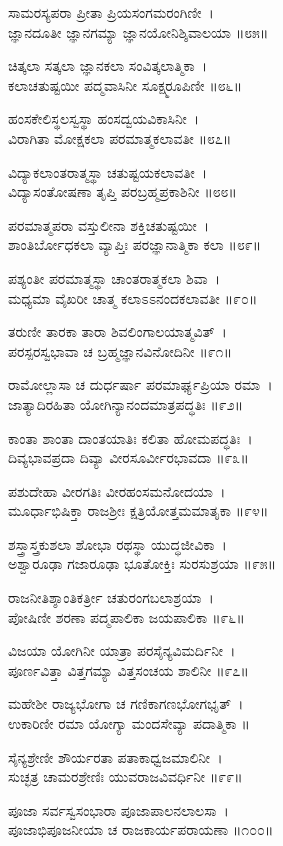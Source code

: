 ಸಾಮರಸ್ಯಪರಾ ಪ್ರೀತಾ ಪ್ರಿಯಸಂಗಮರಂಗಿಣೀ~।\\
ಜ್ಞಾನದೂತೀ ಜ್ಞಾನಗಮ್ಯಾ ಜ್ಞಾನಯೋನಿಶ್ಶಿವಾಲಯಾ ॥೮೫॥

	ಚಿತ್ಕಲಾ ಸತ್ಕಲಾ ಜ್ಞಾನಕಲಾ ಸಂವಿತ್ಕಲಾತ್ಮಿಕಾ~।\\
	ಕಲಾಚತುಷ್ಟಯೀ ಪದ್ಮವಾಸಿನೀ ಸೂಕ್ಷ್ಮರೂಪಿಣೀ ॥೮೬॥

ಹಂಸಕೇಲಿಸ್ಥಲಸ್ವಸ್ಥಾ ಹಂಸದ್ವಯವಿಕಾಸಿನೀ~।\\
ವಿರಾಗಿತಾ ಮೋಕ್ಷಕಲಾ ಪರಮಾತ್ಮಕಲಾವತೀ ॥೮೭॥

	ವಿದ್ಯಾಕಲಾಂತರಾತ್ಮಸ್ಥಾ ಚತುಷ್ಟಯಕಲಾವತೀ~।\\
	ವಿದ್ಯಾಸಂತೋಷಣಾ ತೃಪ್ತಿ ಪರಬ್ರಹ್ಮಪ್ರಕಾಶಿನೀ ॥೮೮॥

ಪರಮಾತ್ಮಪರಾ ವಸ್ತುಲೀನಾ ಶಕ್ತಿಚತುಷ್ಟಯೀ~।\\
ಶಾಂತಿರ್ಬೋಧಕಲಾ ವ್ಯಾಪ್ತಿಃ ಪರಜ್ಞಾನಾತ್ಮಿಕಾ ಕಲಾ ॥೮೯॥

	ಪಶ್ಯಂತೀ ಪರಮಾತ್ಮಸ್ಥಾ ಚಾಂತರಾತ್ಮಕಲಾ ಶಿವಾ~।\\
	ಮಧ್ಯಮಾ ವೈಖರೀ ಚಾತ್ಮ ಕಲಾಽಽನಂದಕಲಾವತೀ ॥೯೦॥

ತರುಣೀ ತಾರಕಾ ತಾರಾ ಶಿವಲಿಂಗಾಲಯಾತ್ಮವಿತ್~।\\
ಪರಸ್ಪರಸ್ವಭಾವಾ ಚ ಬ್ರಹ್ಮಜ್ಞಾನವಿನೋದಿನೀ ॥೯೧॥

	ರಾಮೋಲ್ಲಾಸಾ ಚ ದುರ್ಧರ್ಷಾ ಪರಮಾರ್ಘ್ಯಪ್ರಿಯಾ ರಮಾ~।\\
	ಜಾತ್ಯಾದಿರಹಿತಾ ಯೋಗಿನ್ಯಾನಂದಮಾತ್ರಪದ್ಧತಿಃ ॥೯೨॥

ಕಾಂತಾ ಶಾಂತಾ ದಾಂತಯಾತಿಃ ಕಲಿತಾ ಹೋಮಪದ್ಧತಿಃ~।\\
ದಿವ್ಯಭಾವಪ್ರದಾ ದಿವ್ಯಾ ವೀರಸೂರ್ವೀರಭಾವದಾ ॥೯೩॥

	ಪಶುದೇಹಾ ವೀರಗತಿಃ ವೀರಹಂಸಮನೋದಯಾ~।\\
	ಮೂರ್ಧಾಭಿಷಿಕ್ತಾ ರಾಜಶ್ರೀಃ ಕ್ಷತ್ರಿಯೋತ್ತಮಮಾತೃಕಾ ॥೯೪॥

ಶಸ್ತ್ರಾಸ್ತ್ರಕುಶಲಾ ಶೋಭಾ ರಥಸ್ಥಾ ಯುದ್ಧಜೀವಿಕಾ~।\\
ಅಶ್ವಾರೂಢಾ ಗಜಾರೂಢಾ ಭೂತೋಕ್ತಿಃ ಸುರಸುಶ್ರಯಾ ॥೯೫॥

	ರಾಜನೀತಿಶ್ಶಾಂತಿಕರ್ತ್ರೀ ಚತುರಂಗಬಲಾಶ್ರಯಾ~।\\
	ಪೋಷಿಣೀ ಶರಣಾ ಪದ್ಮಪಾಲಿಕಾ ಜಯಪಾಲಿಕಾ ॥೯೬॥

ವಿಜಯಾ ಯೋಗಿನೀ ಯಾತ್ರಾ ಪರಸೈನ್ಯವಿಮರ್ದಿನೀ~।\\
ಪೂರ್ಣವಿತ್ತಾ ವಿತ್ತಗಮ್ಯಾ ವಿತ್ತಸಂಚಯ ಶಾಲಿನೀ ॥೯೭॥

	ಮಹೇಶೀ ರಾಜ್ಯಭೋಗಾ ಚ ಗಣಿಕಾಗಣಭೋಗಭೃತ್~।\\
	ಉಕಾರಿಣೀ ರಮಾ ಯೋಗ್ಯಾ ಮಂದಸೇವ್ಯಾ ಪದಾತ್ಮಿಕಾ ॥

ಸೈನ್ಯಶ್ರೇಣೀ ಶೌರ್ಯರತಾ ಪತಾಕಾಧ್ವಜಮಾಲಿನೀ~।\\
ಸುಚ್ಛತ್ರ ಚಾಮರಶ್ರೇಣಿಃ ಯುವರಾಜವಿವರ್ಧಿನೀ ॥೯೯॥

	ಪೂಜಾ ಸರ್ವಸ್ವಸಂಭಾರಾ ಪೂಜಾಪಾಲನಲಾಲಸಾ~।\\
	ಪೂಜಾಭಿಪೂಜನೀಯಾ ಚ ರಾಜಕಾರ್ಯಪರಾಯಣಾ ॥೧೦೦॥

